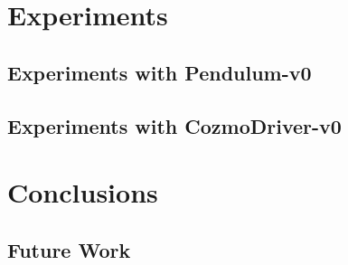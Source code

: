 \documentclass[10pt,twocolumn,letterpaper]{article}
\begin{document}
\section{Experiments}

\subsection{Experiments with Pendulum-v0}

\subsection{Experiments with CozmoDriver-v0}

\section{Conclusions}

\subsection{Future Work}


{\small


}
\end{document}
